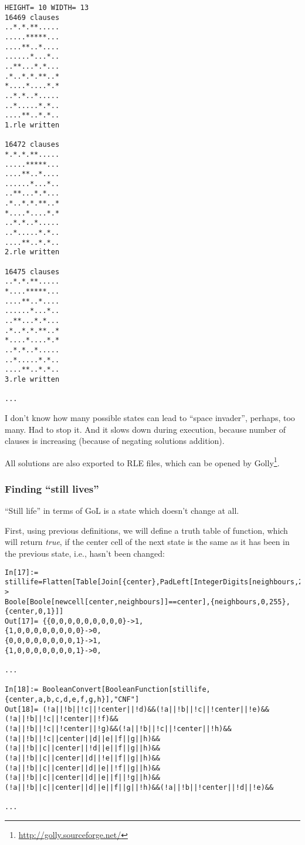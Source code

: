 \begin{lstlisting}
HEIGHT= 10 WIDTH= 13
16469 clauses
..*.*.**.....
.....*****...
....**..*....
......*...*..
..**...*.*...
.*..*.*.**..*
*....*....*.*
..*.*..*.....
..*.....*.*..
....**..*.*..
1.rle written

16472 clauses
*.*.*.**.....
.....*****...
....**..*....
......*...*..
..**...*.*...
.*..*.*.**..*
*....*....*.*
..*.*..*.....
..*.....*.*..
....**..*.*..
2.rle written

16475 clauses
..*.*.**.....
*....*****...
....**..*....
......*...*..
..**...*.*...
.*..*.*.**..*
*....*....*.*
..*.*..*.....
..*.....*.*..
....**..*.*..
3.rle written

...

\end{lstlisting}

I don't know how many possible states can lead to ``space invader'', perhaps, too many.
Had to stop it.
And it slows down during execution, because number of clauses is increasing (because of negating solutions addition).

All solutions are also exported to RLE files, which can be opened by Golly\footnote{\url{http://golly.sourceforge.net/}}.

\subsubsection{Finding ``still lives''}

``Still life'' in terms of GoL is a state which doesn't change at all.

First, using previous definitions, we will define a truth table of function, which will return \textit{true},
if the center cell of the next state is the same as it has been in the previous state, i.e., hasn't been changed:

\begin{lstlisting}
In[17]:= stillife=Flatten[Table[Join[{center},PadLeft[IntegerDigits[neighbours,2],8]]->
Boole[Boole[newcell[center,neighbours]]==center],{neighbours,0,255},{center,0,1}]]
Out[17]= {{0,0,0,0,0,0,0,0,0}->1,
{1,0,0,0,0,0,0,0,0}->0,
{0,0,0,0,0,0,0,0,1}->1,
{1,0,0,0,0,0,0,0,1}->0,

...

In[18]:= BooleanConvert[BooleanFunction[stillife,{center,a,b,c,d,e,f,g,h}],"CNF"]
Out[18]= (!a||!b||!c||!center||!d)&&(!a||!b||!c||!center||!e)&&(!a||!b||!c||!center||!f)&&
(!a||!b||!c||!center||!g)&&(!a||!b||!c||!center||!h)&&(!a||!b||!c||center||d||e||f||g||h)&&
(!a||!b||c||center||!d||e||f||g||h)&&(!a||!b||c||center||d||!e||f||g||h)&&(!a||!b||c||center||d||e||!f||g||h)&&
(!a||!b||c||center||d||e||f||!g||h)&&(!a||!b||c||center||d||e||f||g||!h)&&(!a||!b||!center||!d||!e)&&

...

\end{lstlisting}

